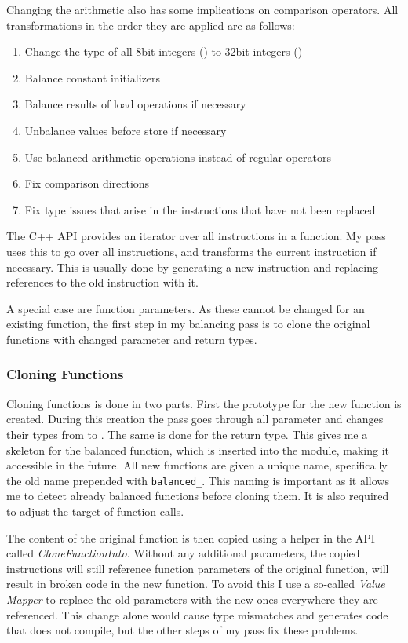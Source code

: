 Changing the arithmetic also has some implications on comparison operators.
All transformations in the order they are applied are as follows:
\begin{enumerate}
\item Change the type of all 8bit integers () to 32bit integers ()
\item Balance constant initializers
\item Balance results of load operations if necessary
\item Unbalance values before store if necessary
\item Use balanced arithmetic operations instead of regular operators
\item Fix comparison directions
\item Fix type issues that arise in the instructions that have not been replaced
\end{enumerate}

The \llvm{} C++ API provides an iterator over all instructions in a function.
My pass uses this to go over all instructions, and transforms the current instruction if necessary.
This is usually done by generating a new \ir{} instruction and replacing references to the old instruction with it.

A special case are function parameters.
As these cannot be changed for an existing function, the first step in my balancing pass is to clone the original functions with changed parameter and return types.

\subsubsection{Cloning Functions}
Cloning functions is done in two parts.
First the prototype for the new function is created.
During this creation the pass goes through all parameter and changes their types from  to .
The same is done for the return type.
This gives me a skeleton for the balanced function, which is inserted into the module, making it accessible in the future.
All new functions are given a unique name, specifically the old name prepended with \texttt{balanced\_}.
This naming is important as it allows me to detect already balanced functions before cloning them.
It is also required to adjust the target of function calls.

The content of the original function is then copied using a helper in the \llvm{} API called \emph{CloneFunctionInto}.
Without any additional parameters, the copied instructions will still reference function parameters of the original function, will result in broken code in the new function.
To avoid this I use a so-called \emph{Value Mapper} to replace the old parameters with the new ones everywhere they are referenced.
This change alone would cause type mismatches and generates code that does not compile, but the other steps of my pass fix these problems.

